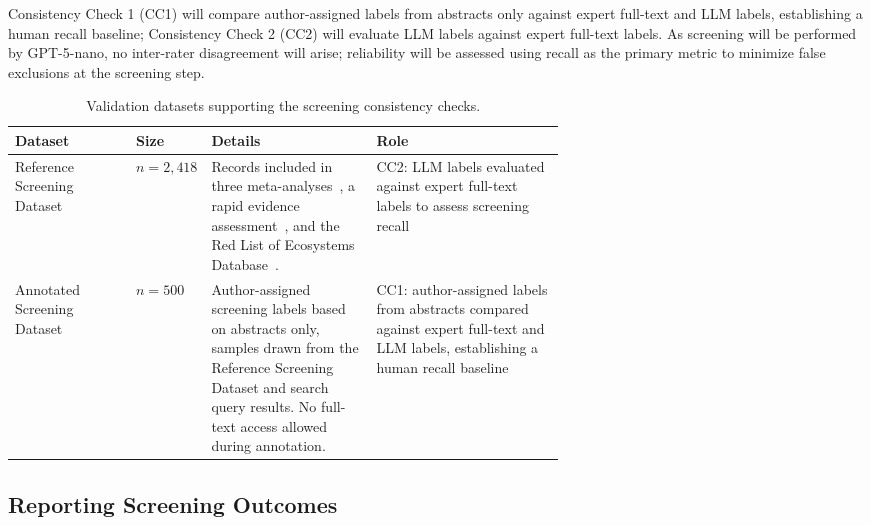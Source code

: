 \documentclass[12pt]{article}
\renewcommand{\arraystretch}{1.2}
\begin{document}
Consistency Check 1 (CC1) will compare author-assigned labels from abstracts only against expert full-text and LLM labels, establishing a human recall baseline; Consistency Check 2 (CC2) will evaluate LLM labels against expert full-text labels. As screening will be performed by GPT-5-nano, no inter-rater disagreement will arise; reliability will be assessed using recall as the primary metric to minimize false exclusions at the screening step.

\begin{table}[H]
\renewcommand{\arraystretch}{1.3}
\setlength{\tabcolsep}{4pt}
\centering
\scriptsize
\begin{tabularx}{\linewidth}{|>{\raggedright\arraybackslash}p{0.22\linewidth}
                             |>{\raggedright\arraybackslash}p{0.12\linewidth}
                             |>{\raggedright\arraybackslash}p{0.30\linewidth}
                             |>{\raggedright\arraybackslash}X|}
\hline
\textbf{Dataset} & \textbf{Size} & \textbf{Details} & 
\textbf{Role} \\
\hline
Reference Screening Dataset & $n = 2{,}418$ & 
Records included in three meta-analyses~\cite{shawetal, kecketal, murphyetal}, a rapid evidence assessment~\cite{jaureguiberry_direct_2022}, and the Red List of Ecosystems Database~\cite{IUCNCEM2022RLE}. & 
CC2: LLM labels evaluated against expert full-text labels to assess screening recall  \\
\hline
Annotated Screening Dataset & $n = 500$ & 
Author-assigned screening labels based on abstracts only, samples drawn from the Reference Screening Dataset and search query results. No full-text access allowed during annotation. & 

CC1: author-assigned labels from abstracts compared against expert full-text and LLM labels, establishing a human recall baseline \\
\hline
\end{tabularx}
\caption{Validation datasets supporting the screening consistency checks.}
\label{tab:dataset_overview_screening}
\end{table}
\subsection*{Reporting Screening Outcomes}
\end{document}
